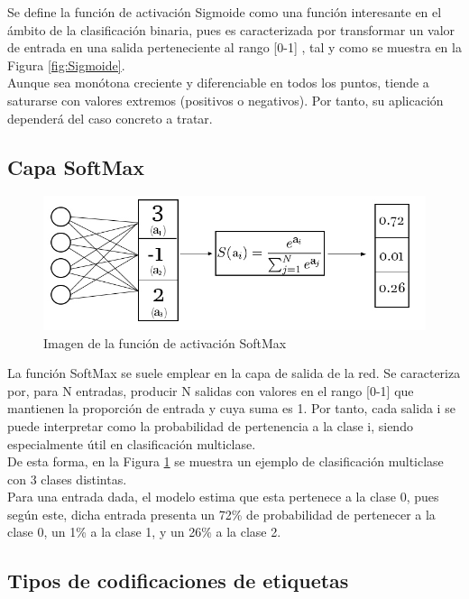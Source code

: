 Se define la función de activación Sigmoide como una función interesante en el ámbito de la clasificación binaria, pues es caracterizada por transformar un valor de entrada en una salida perteneciente al rango [0-1] , tal y como se muestra en la Figura \ref{fig:Sigmoide}. \\
Aunque sea monótona creciente y diferenciable en todos los puntos, tiende a saturarse con valores extremos (positivos o negativos). Por tanto, su aplicación dependerá del caso concreto a tratar. \cite{Sigmoide}

\subsection{Capa SoftMax}

\begin{figure}[H]
	\centering
	\includegraphics[scale=0.35]{imagenes/softmax.jpg}  
	\caption{Imagen de la función de activación SoftMax}
	\label{fig:SoftMax}
\end{figure}

La función SoftMax se suele emplear en la capa de salida de la red. Se caracteriza por, para N entradas, producir N salidas con valores en el rango [0-1] que mantienen la proporción de entrada y cuya suma es 1. Por tanto, cada salida i se puede interpretar como la probabilidad de pertenencia a la clase i, siendo especialmente útil en clasificación multiclase. \cite{SoftMax_MLM} \\
De esta forma, en la Figura \ref{fig:SoftMax} se muestra un ejemplo de clasificación multiclase con 3 clases distintas. \\
Para una entrada dada, el modelo estima que esta pertenece a la clase 0, pues según este, dicha entrada presenta un 72\% de probabilidad de pertenecer a la clase 0, un 1\% a la clase 1, y un 26\% a la clase 2.


\subsection{Tipos de codificaciones de etiquetas}

